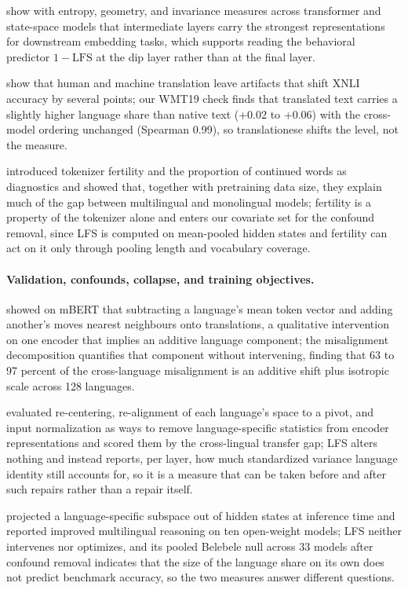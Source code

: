 \documentclass[11pt,a4paper]{article}
\begin{document}
\citet{skean2025layer} show with entropy, geometry, and invariance measures across transformer and state-space models that intermediate layers carry the strongest representations for downstream embedding tasks, which supports reading the behavioral predictor $1-\mathrm{LFS}$ at the dip layer rather than at the final layer.

\citet{artetxe2020artifacts} show that human and machine translation leave artifacts that shift XNLI accuracy by several points; our WMT19 check finds that translated text carries a slightly higher language share than native text (+0.02 to +0.06) with the cross-model ordering unchanged (Spearman 0.99), so translationese shifts the level, not the measure.

\citet{rust2021tokenizer} introduced tokenizer fertility and the proportion of continued words as diagnostics and showed that, together with pretraining data size, they explain much of the gap between multilingual and monolingual models; fertility is a property of the tokenizer alone and enters our covariate set for the confound removal, since LFS is computed on mean-pooled hidden states and fertility can act on it only through pooling length and vocabulary coverage.

\paragraph{Validation, confounds, collapse, and training objectives.}
\citet{gonen2020greek} showed on mBERT that subtracting a language's mean token vector and adding another's moves nearest neighbours onto translations, a qualitative intervention on one encoder that implies an additive language component; the misalignment decomposition quantifies that component without intervening, finding that 63 to 97 percent of the cross-language misalignment is an additive shift plus isotropic scale across 128 languages.

\citet{zhao2021inducing} evaluated re-centering, re-alignment of each language's space to a pivot, and input normalization as ways to remove language-specific statistics from encoder representations and scored them by the cross-lingual transfer gap; LFS alters nothing and instead reports, per layer, how much standardized variance language identity still accounts for, so it is a measure that can be taken before and after such repairs rather than a repair itself.

\citet{zhao2025disentanglement} projected a language-specific subspace out of hidden states at inference time and reported improved multilingual reasoning on ten open-weight models; LFS neither intervenes nor optimizes, and its pooled Belebele null across 33 models after confound removal indicates that the size of the language share on its own does not predict benchmark accuracy, so the two measures answer different questions.
\end{document}
